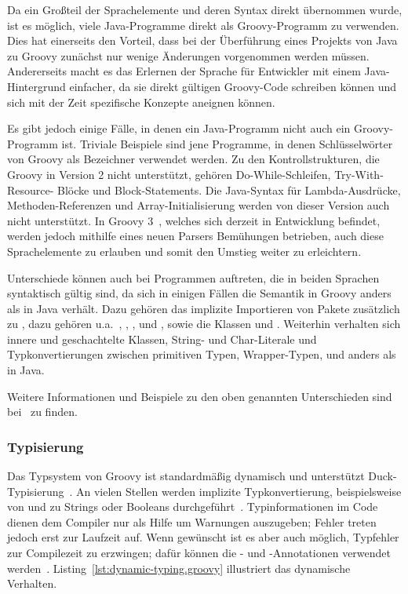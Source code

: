 Da ein Großteil der Sprachelemente und deren Syntax direkt übernommen wurde, ist es möglich, viele Java-Programme direkt als Groovy-Programm zu verwenden.
Dies hat einerseits den Vorteil, dass bei der Überführung eines Projekts von Java zu Groovy zunächst nur wenige Änderungen vorgenommen werden müssen.
Andererseits macht es das Erlernen der Sprache für Entwickler mit einem Java-Hintergrund einfacher, da sie direkt gültigen Groovy-Code schreiben können und sich mit der Zeit spezifische Konzepte aneignen können.

Es gibt jedoch einige Fälle, in denen ein Java-Programm nicht auch ein Groovy-Programm ist.
Triviale Beispiele sind jene Programme, in denen Schlüsselwörter von Groovy als Bezeichner verwendet werden.
Zu den Kontrollstrukturen, die Groovy in Version 2 nicht unterstützt, gehören Do-While-Schleifen, Try-With-Resource- Blöcke und Block-Statements.
Die Java-Syntax für Lambda-Ausdrücke, Methoden-Referenzen und Array-Initialisierung werden von dieser Version auch nicht unterstützt.
In Groovy 3~\cite{groovy-lang:release3}, welches sich derzeit in Entwicklung befindet, werden jedoch mithilfe eines neuen Parsers Bemühungen betrieben, auch diese Sprachelemente zu erlauben und somit den Umstieg weiter zu erleichtern.

Unterschiede können auch bei Programmen auftreten, die in beiden Sprachen syntaktisch gültig sind, da sich in einigen Fällen die Semantik in Groovy anders als in Java verhält.
Dazu gehören das implizite Importieren von Pakete zusätzlich zu , dazu gehören u.a.~, , ,  und , sowie die Klassen  und .
Weiterhin verhalten sich innere und geschachtelte Klassen, String- und Char-Literale und Typkonvertierungen zwischen primitiven Typen, Wrapper-Typen,  und  anders als in Java.

Weitere Informationen und Beispiele zu den oben genannten Unterschieden sind bei~\cite{groovy-lang:differences} zu finden.

\subsubsection{Typisierung}\label{subsubsec:typisierung}

Das Typsystem von Groovy ist standardmäßig dynamisch und unterstützt Duck-Typisierung~\cite[Abs.~6.]{groovy-lang:semantics}.
An vielen Stellen werden implizite Typkonvertierung, beispielsweise von und zu Strings oder Booleans durchgeführt~\cite[Abs.~3.]{groovy-lang:semantics}.
Typinformationen im Code dienen dem Compiler nur als Hilfe um Warnungen auszugeben; Fehler treten jedoch erst zur Laufzeit auf.
Wenn gewünscht ist es aber auch möglich, Typfehler zur Compilezeit zu erzwingen; dafür können die - und -Annotationen verwendet werden~\cite[Abs.~6.2.]{groovy-lang:semantics}.
Listing~\ref{lst:dynamic-typing.groovy} illustriert das dynamische Verhalten.

